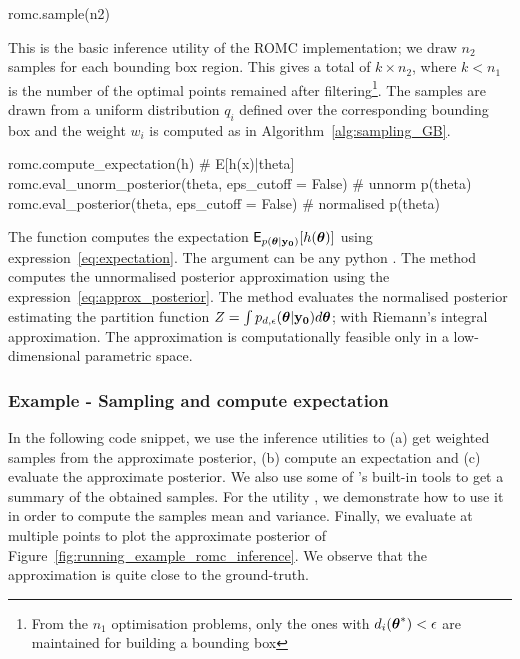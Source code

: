 \begin{Code}
romc.sample(n2)
\end{Code}

\noindent
This is the basic inference utility of the ROMC implementation; we
draw \(n_2\) samples for each bounding box region. This gives a total of
\(k \times n_2\), where \(k < n_1\) is the number of the optimal points
remained after filtering\footnote{From the \(n_1\) optimisation
  problems, only the ones with \(d_i(\boldsymbol{\theta}^*) < \epsilon\) are
  maintained for building a bounding box}. The samples are drawn from
a uniform distribution \(q_i\) defined over the corresponding bounding
box and the weight \(w_i\) is computed as in
Algorithm~\ref{alg:sampling_GB}.

\begin{Code}
romc.compute_expectation(h) # E[h(x)|theta]
romc.eval_unorm_posterior(theta, eps_cutoff = False) # unnorm p(theta)
romc.eval_posterior(theta, eps_cutoff = False) # normalised p(theta)
\end{Code}

\noindent
The function  computes the expectation
\(\mathsf{E}_{p(\boldsymbol{\theta}|\mathbf{y_0})}[h(\boldsymbol{\theta})]\) using
expression~\eqref{eq:expectation}. The argument  can be any
python . The method  computes
the unnormalised posterior approximation using the
expression~\eqref{eq:approx_posterior}. The method 
evaluates the normalised posterior estimating the partition function
\(Z = \int p_{d,\epsilon}(\boldsymbol{\theta}|\mathbf{y_0})d\boldsymbol{\theta}\); with Riemann's
integral approximation. The approximation is computationally feasible
only in a low-dimensional parametric space.

\subsubsection*{Example - Sampling and compute expectation}

In the following code snippet, we use the inference utilities to (a)
get weighted samples from the approximate posterior, (b) compute an
expectation and (c) evaluate the approximate posterior. We also use
some of 's built-in tools to get a summary of the obtained
samples. For the utility , we demonstrate
how to use it in order to compute the samples mean and
variance. Finally, we evaluate  at multiple
points to plot the approximate posterior of
Figure~\ref{fig:running_example_romc_inference}. We observe that the
approximation is quite close to the ground-truth.

